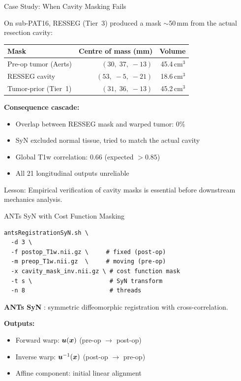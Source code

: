 \begin{frame}{Case Study: When Cavity Masking Fails}

  On sub-PAT16, RESSEG (Tier~3) produced a mask \alert{$\sim$50\,mm from
  the actual resection cavity}:

  \medskip

  \begin{tabular}{lrr}
    \toprule
    \textbf{Mask} & \textbf{Centre of mass (mm)} & \textbf{Volume} \\
    \midrule
    Pre-op tumor (Aerts) & $(30,\; 37,\; {-}13)$ & 45.4\,cm$^3$ \\
    RESSEG cavity        & $(53,\; {-}5,\; {-}21)$ & 18.6\,cm$^3$ \\
    Tumor-prior (Tier~1) & $(31,\; 36,\; {-}13)$ & 45.2\,cm$^3$ \\
    \bottomrule
  \end{tabular}

  \medskip

  \textbf{Consequence cascade:}
  \begin{itemize}
    \item Overlap between RESSEG mask and warped tumor: \alert{0\%}
    \item SyN excluded normal tissue, tried to match the actual cavity
    \item Global T1w correlation: \alert{0.66} (expected $> 0.85$)
    \item All 21 longitudinal outputs unreliable
  \end{itemize}

  \medskip

  \alert{Lesson:} Empirical verification of cavity masks is essential
  before downstream mechanics analysis.

\end{frame}

\begin{frame}[fragile]{ANTs SyN with Cost Function Masking}

  \begin{lstlisting}
antsRegistrationSyN.sh \
  -d 3 \
  -f postop_T1w.nii.gz \     # fixed (post-op)
  -m preop_T1w.nii.gz  \     # moving (pre-op)
  -x cavity_mask_inv.nii.gz \ # cost function mask
  -t s \                      # SyN transform
  -n 8                        # threads
  \end{lstlisting}

  \bigskip

  \textbf{ANTs SyN} \cite{Avants2008}: symmetric diffeomorphic
  registration with cross-correlation.

  \bigskip

  \textbf{Outputs:}
  \begin{itemize}
    \item Forward warp: $\bm{u}(\bm{x})$ (pre-op $\to$ post-op)
    \item Inverse warp: $\bm{u}^{-1}(\bm{x})$ (post-op $\to$ pre-op)
    \item Affine component: initial linear alignment
  \end{itemize}

\end{frame}


